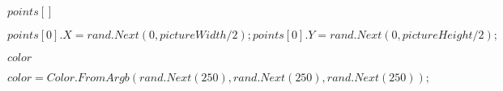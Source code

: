 \documentclass{article}
\begin{document}
$ points[]$
\pagebreak

\[
     points[0].X = rand.Next(0, pictureWidth / 2); points[0].Y = rand.Next(0, pictureHeight / 2);
\]
\pagebreak

$ color$
\pagebreak

\[
     color = Color.FromArgb(rand.Next(250), rand.Next(250), rand.Next(250));
\]
\pagebreak
\end{document}
